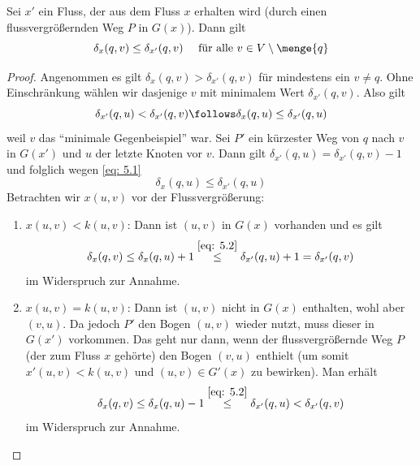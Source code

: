 \begin{lemma}
	\label{lemma: 5.5}
	Sei $x'$ ein Fluss, der aus dem Fluss $x$ erhalten wird (durch einen flussvergrößernden Weg $P$ in $G(x)$). Dann gilt
	\begin{equation*}
		\delta_x(q,v) \le \delta_{x'}(q,v) \quad \text{ für alle } v \in V \setminus \menge{q}
	\end{equation*}
\end{lemma}
\begin{proof}
	Angenommen es gilt $\delta_x(q,v) > \delta_{x'}(q,v)$ für mindestens ein $v \neq q$. Ohne Einschränkung wählen wir dasjenige $v$ mit minimalem Wert $\delta_{x'}(q,v)$. Also gilt
	\begin{equation}
		\delta_{x'}(q,u) < \delta_{x'}(q,v) \follows \delta_x(q,u) \le \delta_{x'}(q,u)
		\label{eq: 5.1}
	\end{equation}
	weil $v$ das \enquote{minimale Gegenbeispiel} war. Sei $P'$ ein kürzester Weg von $q$ nach $v$ in $G(x')$ und $u$ der letzte Knoten vor $v$. Dann gilt $\delta_{x'}(q,u) = \delta_{x'}(q,v) - 1$ und folglich wegen \eqref{eq: 5.1} 
	\begin{equation}
		\delta_x(q,u) \le \delta_{x'}(q,u)
		\label{eq: 5.2}
	\end{equation}
	Betrachten wir $x(u,v)$ vor der Flussvergrößerung:
	\begin{enumerate}[label=(\alph*), nolistsep]
		\item $x(u,v) < k(u,v)$: Dann ist $(u,v)$ in $G(x)$ vorhanden und es gilt
		\begin{equation*}
			\delta_x(q,v) \le \delta_x(q,u) + 1 \overset{\eqref{eq: 5.2}}{\le} \delta_{x'}(q,u) + 1 = \delta_{x'}(q,v)
		\end{equation*}
		im Widerspruch zur Annahme.
		\item $x(u,v) = k(u,v)$: Dann ist $(u,v)$ nicht in $G(x)$ enthalten, wohl aber $(v,u)$. Da jedoch $P'$ den Bogen $(u,v)$ wieder nutzt, muss dieser in $G(x')$ vorkommen. Das geht nur dann, wenn der flussvergrößernde Weg $P$ (der zum Fluss $x$ gehörte) den Bogen $(v,u)$ enthielt (um somit $x'(u,v) < k(u,v)$ und $(u,v) \in G'(x)$ zu bewirken). Man erhält
		\begin{equation*}
			\delta_x(q,v) \le \delta_x(q,u) - 1 \overset{\eqref{eq: 5.2}}{\le} \delta_{x'}(q,u) < \delta_{x'}(q,v)
		\end{equation*}
		im Widerspruch zur Annahme.
	\end{enumerate}
\end{proof}

